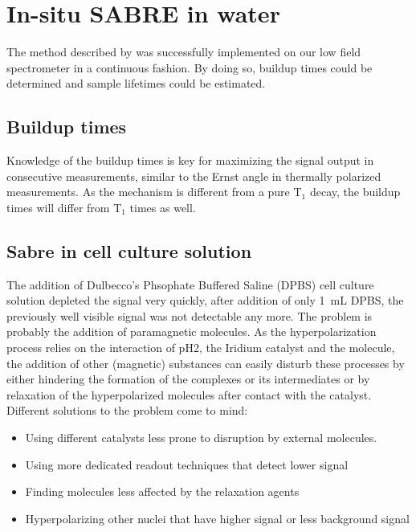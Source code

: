     \section{In-situ SABRE in water}
    The method described by \cite{truong_irreversible_2014-1} was successfully implemented on our low field spectrometer in a continuous fashion. By doing so, buildup times could be determined and sample lifetimes could be estimated.
        \subsection{Buildup times}
            Knowledge of the buildup times is key for maximizing the signal output in consecutive measurements, similar to the Ernst angle in thermally polarized measurements. As the mechanism is different from a pure T$_1$ decay, the buildup times will differ from T$_1$ times as well.
        \subsection{Sabre in cell culture solution}
        \label{sec:discussion:cellSolution}
        The addition of Dulbecco's Phsophate Buffered Saline (DPBS) cell culture solution depleted the signal very quickly, after addition of only \SI{1}{\milli\liter} DPBS, the previously well visible signal was not detectable any more. The problem is probably the addition of paramagnetic molecules. As the hyperpolarization process relies on the interaction of pH2, the Iridium catalyst and the molecule, the addition of other (magnetic) substances can easily disturb these processes by either hindering the formation of the complexes or its intermediates or by relaxation of the hyperpolarized molecules after contact with the catalyst. Different solutions to the problem come to mind: 
            \begin{itemize}
            \setlength{\itemsep}{-7pt}
                \item Using different catalysts less prone to disruption by external molecules.
                \item Using more dedicated readout techniques that detect lower signal
                \item Finding molecules less affected by the relaxation agents
                \item Hyperpolarizing other nuclei that have higher signal or less background signal
            \end{itemize}
